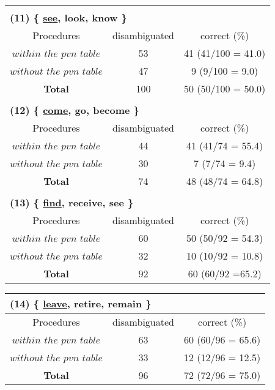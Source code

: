 {\begin{table}[htbp]
\begin{center}
\begin{tabular}{c||c|c}
\multicolumn{3}{c}{} \\
\multicolumn{3}{l}{\bf{(11) \{ \underline{see}, look, know \}}} \\
\hline \hline
Procedures &disambiguated &correct (\%)  \\ \hline \hline
$within$ $the$ $pvn$ $table$  &53 &41 (41/100 = 41.0) \\ \hline
$without$ $the$ $pvn$ $table$  &47 &9 (9/100 = 9.0) \\ \hline
{\bf Total} &100  &50 (50/100 = 50.0) \\ \hline
\multicolumn{3}{c}{} \\
\multicolumn{3}{l}{\bf{(12) \{ \underline{come}, go, become \}}} \\
\hline \hline
Procedures &disambiguated &correct (\%)  \\ \hline \hline
$within$ $the$ $pvn$ $table$  &44  &41 (41/74 = 55.4) \\ \hline
$without$ $the$ $pvn$ $table$  &30 &7 (7/74 = 9.4) \\ \hline
{\bf Total} &74 &48 (48/74 = 64.8) \\ \hline
\multicolumn{3}{c}{} \\
\multicolumn{3}{l}{\bf{(13) \{ \underline{find}, receive, see \}}} \\
\hline \hline
Procedures &disambiguated &correct (\%) \\ \hline \hline
$within$ $the$ $pvn$ $table$ &60  &50 (50/92 = 54.3) \\ \hline
$without$ $the$ $pvn$ $table$ &32 &10 (10/92 = 10.8) \\ \hline
{\bf Total} &92 &60 (60/92 =65.2) \\ \hline
\end{tabular}
\end{center}
\end{table}
}

\clearpage
{\footnotesize
\begin{table}[htbp]
\begin{center}
\begin{tabular}{c||c|c} 
\multicolumn{3}{l}{\bf{(14) \{ \underline{leave}, retire, remain \}}}
\\ \hline \hline
Procedures &disambiguated &correct (\%)  \\ \hline \hline
$within$ $the$ $pvn$ $table$  &63 &60 (60/96 = 65.6) \\ \hline
$without$ $the$ $pvn$ $table$  &33 &12 (12/96 = 12.5) \\ \hline
{\bf Total} &96 &72 (72/96 = 75.0) \\ \hline
\end{tabular}
\end{center}
\end{table}
}

